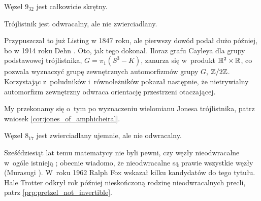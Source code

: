 \begin{example}
    Węzeł $9_{32}$ jest całkowicie skrętny.
\end{example}


\begin{example}
    \label{exm:trefoil_is_chiral}
    Trójlistnik jest odwracalny, ale nie zwierciadlany.
\end{example}

Przypuszczał to już Listing \cite{listing1847} w 1847 roku, ale pierwszy dowód podał dużo później, bo w 1914 roku Dehn \cite{dehn1914}. 
Oto, jak tego dokonał.
Iloraz grafu Cayleya dla grupy podstawowej trójlistnika, $G = \pi_1(S^3 - K)$, zanurza się w~produkt $\mathbb H^2 \times \mathbb R$, co pozwala wyznaczyć grupę zewnętrznych automorfizmów grupy $G$, $\mathbb Z/2\mathbb Z$.
Korzystając z~południków i~równoleżników pokazał następnie, że nietrywialny automorfizm zewnętrzny odwraca orientację przestrzeni otaczającej.

My przekonamy się o~tym po wyznaczeniu wielomianu Jonesa trójlistnika, patrz wniosek \ref{cor:jones_of_amphicheiral}.

\begin{example}
    Węzeł $8_{17}$ jest zwierciadlany ujemnie, ale nie odwracalny.
\end{example}

Sześćdziesiąt lat temu matematycy nie byli pewni, czy węzły nieodwracalne w~ogóle istnieją \cite[problem 10]{fox1962};
obecnie wiadomo, że nieodwracalne są prawie wszystkie węzły (Murasugi \cite[s.~46]{murasugi1996}).
%
W~roku 1962 Ralph Fox wskazał kilku kandydatów do tego tytułu.
%
Hale Trotter odkrył rok później nieskończoną rodzinę nieodwracalnych precli, patrz \ref{prp:pretzel_not_invertible}.
%

